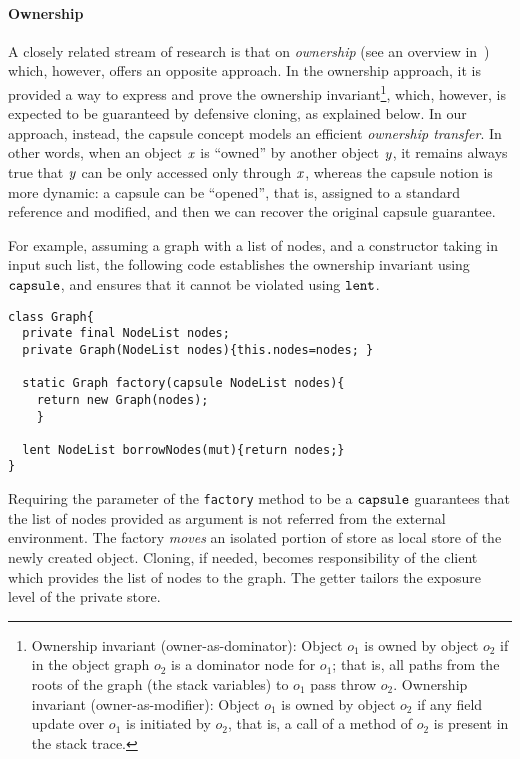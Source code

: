 \paragraph{Ownership} A {closely related} stream of research is that on \emph{ownership} (see an overview in~\cite{ClarkeEtAl13}) which, however, offers an {opposite} approach. In the ownership approach, it is provided a way to express and prove the ownership invariant\footnote{{Ownership invariant (owner-as-dominator):
Object $o_1$ is owned by object  $o_2$ if in the object graph $o_2$
is a dominator node for $o_1$;
that is, all paths from the roots of the graph (the stack variables)
to $o_1$ pass throw $o_2$.
Ownership invariant (owner-as-modifier):
Object $o_1$ is owned by object  $o_2$ if any field update over $o_1$
is initiated by $o_2$, that is, a call of a method of $o_2$ is present
in the stack trace.}}, which, however, is expected to be guaranteed by defensive cloning, as explained below. In our approach, instead, the capsule concept models an efficient \emph{ownership transfer}. In other words, when an object $\mathit{x}$ is ``owned'' by another object $\mathit{y}$, it remains always true that $\mathit{y}$ can be only accessed only through $\mathit{x}$, whereas the capsule notion is more dynamic: a capsule can be ``opened'', that is, assigned to a standard reference and modified, and then we can recover the original capsule guarantee. 

For example, assuming a graph with a list of nodes, and a constructor taking in input such list,
the following code establishes the ownership invariant using $\texttt{capsule}$, and ensures that it cannot be violated using $\texttt{lent}$.
\begin{lstlisting}
class Graph{
  private final NodeList nodes;
  private Graph(NodeList nodes){this.nodes=nodes; }

  static Graph factory(capsule NodeList nodes){
    return new Graph(nodes);
    }
  
  lent NodeList borrowNodes(mut){return nodes;}
}
\end{lstlisting}
Requiring the parameter of the \lstinline{factory}{} method to be a $\texttt{capsule}$ guarantees that the list of nodes provided as argument is not referred from the external environment. 
The factory \emph{moves} an isolated portion of store as local store of the newly created object. 
Cloning, if needed, becomes responsibility of the client which provides the list of nodes to the graph. The getter tailors the exposure level of the private store. 

